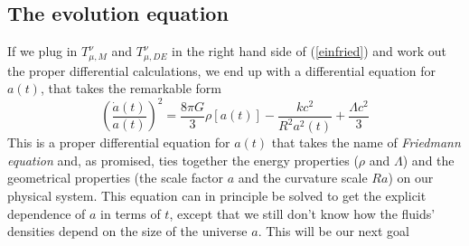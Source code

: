 \documentclass[11pt, a4paper,oneside,openright]{book}
\numberwithin{equation}{section}
\begin{document}
\subsection{The evolution equation} 
If we plug in $T_{\mu,M}^\nu$ and $T_{\mu,DE}^\nu$ in the right hand side of (\ref{einfried}) and work out the proper differential calculations, we end up with a differential equation for $a(t)$, that takes the remarkable form 
\begin{equation}
\label{friedmanneq}
\left(\frac{\dot{a}(t)}{a(t)}\right)^2=\frac{8\pi G}{3}\rho[a(t)]-\frac{kc^2}{R^2a^2(t)}+\frac{\Lambda c^2}{3}
\end{equation}
This is a proper differential equation for $a(t)$ that takes the name of \textit{Friedmann equation} and, as promised, ties together the energy properties ($\rho$ and $\Lambda$) and the geometrical properties (the scale factor $a$ and the curvature scale $Ra$) on our physical system. This equation can in principle be solved to get the explicit dependence of $a$ in terms of $t$, except that we still don't know how the fluids' densities depend on the size of the universe $a$. This will be our next goal
\end{document}
